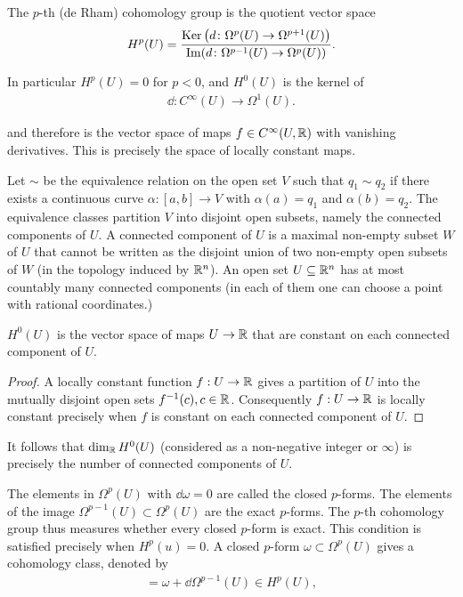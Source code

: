 \begin{definition}\label{def:3-8}
The $p$-th (de Rham) cohomology group is the quotient vector space
\begin{align*}
  H^p(U) 
  = \frac {\operatorname{Ker}\big(d\colon\Omega^p(U)\to\Omega^{p+1}(U)\big)}
          {\operatorname{Im}(d\colon\Omega^{p-1}(U)\to\Omega^p(U))}.
\end{align*}

In particular $H^p(U) = 0$ for $p<0$, and $H^0(U)$ is the kernel of
\begin{align*}
  \dd:C^\infty(U)\to\Omega^1(U).
\end{align*}

and therefore is the vector space of maps $f\in C^\infty(U, \mathbb{R})$ with vanishing 
derivatives. This is precisely the space of locally constant maps.

Let $\sim$ be the equivalence relation on the open set $V$ such that $q_1\sim q_2$ if there
exists a continuous curve $\alpha: [a, b]\to V$ with $\alpha(a) = q_1$ and $\alpha(b) = q_2$. The
equivalence classes partition $V$ into disjoint open subsets, namely the connected components of $U$. 
A connected component of $U$ is a maximal non-empty subset $W$ of $U$ that cannot be written as the 
disjoint union of two non-empty open subsets of $W$ (in the topology induced by $\mathbb{R}^n$). An open 
set $U\subseteq\mathbb{R}^n$ has at most countably many connected components (in each of them one can choose 
a point with rational coordinates.)
\end{definition}



\begin{lemma}\label{lemma:3-9}
  $H^0(U)$ is the vector space of maps $U\to \mathbb{R}$ that are constant on each
connected component of $U$.
\end{lemma}

\begin{proof}
  A locally constant function $f:U\to\mathbb{R}$ gives a partition of $U$ into the
mutually disjoint open sets $f^{-1}(c), c\in\mathbb{R}$. Consequently $f:U\to\mathbb{R}$ is locally
constant precisely when $f$ is constant on each connected component of $U$.
\end{proof}

It follows that $\dim_{\mathbb{R}} H^0(U)$ (considered as a non-negative integer or $\infty$) is precisely
the number of connected components of $U$.


The elements in $\Omega^p(U)$ with $\dd\omega = 0$ are called the closed $p$-forms. The elements
of the image $\Omega^{p-1}(U)\subset\Omega^p(U)$ are the exact $p$-forms. The $p$-th cohomology
group thus measures whether every closed $p$-form is exact. This condition is
satisfied precisely when $H^p(u) = 0$. A closed $p$-form $\omega\subset\Omega^p(U)$ gives a
cohomology class, denoted by
\begin{align*}
  [\omega] = \omega + \dd\Omega^{p-1}(U) \in H^p(U),
\end{align*}

